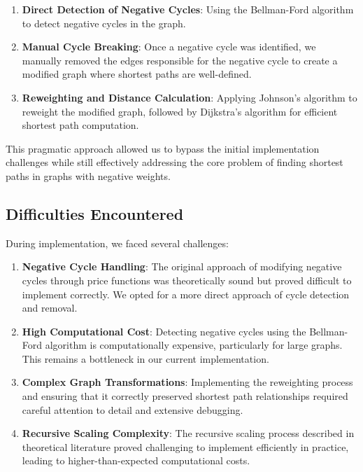 \documentclass[11pt]{article}
\begin{document}
\begin{enumerate}
    \item \textbf{Direct Detection of Negative Cycles}: Using the Bellman-Ford algorithm to detect negative cycles in the graph.
    
    \item \textbf{Manual Cycle Breaking}: Once a negative cycle was identified, we manually removed the edges responsible for the negative cycle to create a modified graph where shortest paths are well-defined.
    
    \item \textbf{Reweighting and Distance Calculation}: Applying Johnson's algorithm to reweight the modified graph, followed by Dijkstra's algorithm for efficient shortest path computation.
\end{enumerate}

This pragmatic approach allowed us to bypass the initial implementation challenges while still effectively addressing the core problem of finding shortest paths in graphs with negative weights.

\subsection{Difficulties Encountered}

During implementation, we faced several challenges:

\begin{enumerate}
    \item \textbf{Negative Cycle Handling}: The original approach of modifying negative cycles through price functions was theoretically sound but proved difficult to implement correctly. We opted for a more direct approach of cycle detection and removal.
    
    \item \textbf{High Computational Cost}: Detecting negative cycles using the Bellman-Ford algorithm is computationally expensive, particularly for large graphs. This remains a bottleneck in our current implementation.
    
    \item \textbf{Complex Graph Transformations}: Implementing the reweighting process and ensuring that it correctly preserved shortest path relationships required careful attention to detail and extensive debugging.
    
    \item \textbf{Recursive Scaling Complexity}: The recursive scaling process described in theoretical literature proved challenging to implement efficiently in practice, leading to higher-than-expected computational costs.
\end{enumerate}
\end{document}
